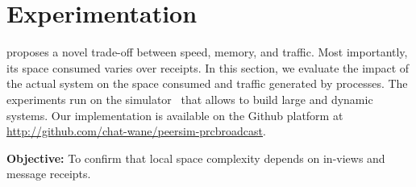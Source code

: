 
\section{Experimentation}
\label{sec:experimentation}

\RPCBROADCAST proposes a novel trade-off between speed, memory, and
traffic. Most importantly, its space consumed varies over receipts. In this
section, we evaluate the impact of the actual system on the space consumed and
traffic generated by processes. The experiments run on the \PEERSIM
simulator~\cite{montresor2009peersim} that allows to build large and dynamic
systems. Our implementation is available on the Github platform at
\url{http://github.com/chat-wane/peersim-prcbroadcast}.

\noindent \textbf{Objective:} To confirm that local space complexity
depends on in-views and message receipts.

